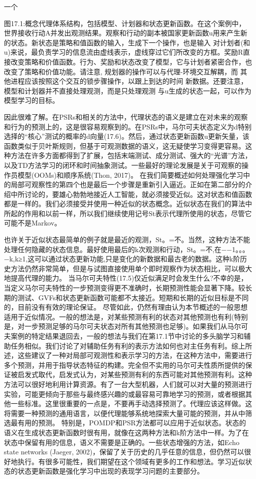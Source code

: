 一个


图17.1:概念代理体系结构，包括模型、计划器和状态更新函数。在这个案例中，世界接收行动A并发出观测结果。观察和行动的副本被国家更新函数u用来产生新的状态。新状态是策略和值函数的输入，生成下一个操作，也是输入
对计划者(和u)来说，最负责学习的信息流由虚线表示，虚线穿过它们所改变的方框。奖励R直接改变策略和价值函数。行为、奖励和状态改变了模型，它与计划者紧密合作，也改变了策略和价值功能。请注意,
规划器的操作可以与代理-环境交互解耦，而
其他进程应该按照这个交互的锁步骤操作，以跟上到达的时间
新数据。还要注意，模型和计划器并不直接处理观测，而是只处理观测
与u生成的状态一起，可以作为模型学习的目标。

因此很难了解。在PSRs和相关的方法中，代理状态的语义是建立在对未来的观察和行为的预测上的，这是很容易观察到的。在PSRs中，马尔可夫状态定义为d特别选择的“核心”测试的概率的d向量(17.6)。然后，通过状态更新函数u更新矢量，该函数类似于贝叶斯规则，但基于可观测数据的语义，这无疑使学习变得更容易。这种方法在许多方面都得到了扩展，包括末端测试、成分测试、强大的“光谱”方法，以及TD方法学习的闭环和时间抽象测试。一些最好的理论发展是关于可观察的操作员模型(OOMs)和顺序系统(Thon, 2017)。
在我们简要概述如何处理强化学习中的局部可观察性的第四个也是最后一个步骤是重新引入逼近。正如在第二部分的介绍中所讨论的，要雄心勃勃地接近人工智能，就必须接受近似。这对状态和值函数都是一样的。我们必须接受并使用一种近似的状态概念。近似状态在我们的算法中所起的作用和以前一样，所以我们继续使用记号St表示代理所使用的状态，尽管它可能不是Markov。

也许关于近似状态最简单的例子就是最近的观测，St。=不。当然，这种方法不能处理任何隐藏的状态信息。最好使用最后的k次观测和行动，St。=不,在−−1。。。−k,k≥1,这可以通过状态更新功能,只是变化的新数据和最古老的数据。这种k阶历史方法仍然非常简单，但是与试图直接使用单个即时观察作为状态相比，可以极大地提高代理的能力。
当马尔可夫特性(17.5)仅近似满足时会发生什么?不幸的是，当定义马尔可夫特性的一步预测变得更不准确时，长期预测性能会显著下降。较长期的测试、GVFs和状态更新函数可能都不太接近。短期和长期的近似目标是不同的，目前没有有效的理论保证。
尽管如此，仍然有理由认为本节概述的一般思想适用于近似情况。一般的想法是，对某些预测有利的状态对其他预测也有利(特别是，对一步预测足够的马尔可夫状态对所有其他预测也足够)。如果我们从马尔可夫案例的特定结果退回去，一般的想法与我们在第17.1节中讨论的多头脑学习和辅助任务相似。我们讨论了对辅助任务有利的表示方法如何也对主任务有利。综上所述，这些建议了一种对局部可观测性和表示学习的方法，在这种方法中，需要进行多个预测，并用于指导状态特征的构建。完全但不实用的马尔可夫性质所提供的保证被启发式取代，启发式认为，对某些预测有利的东西可能对其他预测有利。这种方法可以很好地利用计算资源。有了一台大型机器，人们就可以对大量的预测进行实验，可能更倾向于那些与最终感兴趣的或最容易可靠地学习的预测，或者根据其他一些标准。这里很重要的一点是，不要再手动选择预测了。代理应该这样做。这将需要一种预测的通用语言，以便代理能够系统地探索大量可能的预测，并从中筛选最有用的预测。
特别是，POMDP和PSR方法都可以应用于近似状态。状态的语义在生成状态更新函数时很有用，就像在这两种方法和k阶方法中一样。为了在状态中保留有用的信息，语义不需要是正确的。一些状态增强的方法，如Echo state networks (Jaeger, 2002)，保留了关于历史的几乎任意的信息，但仍然可以很好地执行。有很多可能性，我们期望在这个领域有更多的工作和想法。学习近似状态的状态更新函数是强化学习中出现的表现学习问题的主要部分。

